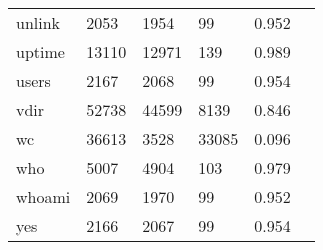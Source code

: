 \begin{longtable}{lp{2.4cm}p{2.4cm}p{2.4cm}p{2.4cm}p{2.4cm}}
unlink    &                                    2053 &                        1954 &                           99 &                                   0.952 \\
uptime    &                                   13110 &                       12971 &                          139 &                                   0.989 \\
users     &                                    2167 &                        2068 &                           99 &                                   0.954 \\
vdir      &                                   52738 &                       44599 &                         8139 &                                   0.846 \\
wc        &                                   36613 &                        3528 &                        33085 &                                   0.096 \\
who       &                                    5007 &                        4904 &                          103 &                                   0.979 \\
whoami    &                                    2069 &                        1970 &                           99 &                                   0.952 \\
yes       &                                    2166 &                        2067 &                           99 &                                   0.954 \\
\end{longtable}
